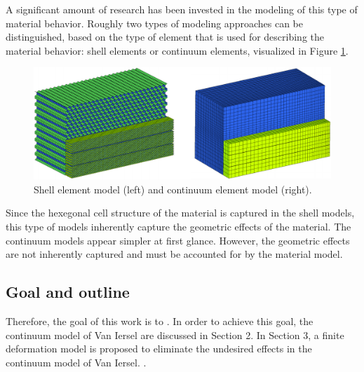 A significant amount of research has been invested in the modeling of this type of material behavior. Roughly two types of modeling approaches can be distinguished, based on the type of element that is used for describing the material behavior: shell elements or continuum elements, visualized in Figure \ref{Ch2_shellsolid}. \\
\begin{figure}[H]
    \centering
    \includegraphics[width=0.8\linewidth]{./Images/Ch1/Ch1_niedermeyer_shellsolid.PNG}
    \caption{Shell element model (left) and continuum element model (right). \cite{niedermeyer}}
    \label{Ch2_shellsolid}
\end{figure}
Since the hexegonal cell structure of the material is captured in the shell models, this type of models inherently capture the geometric effects of the material. The continuum models appear simpler at first glance. However, the geometric effects are not inherently captured and must be accounted for by the material model.\\

{\color{red}{MEER TYPEN}}

\subsection{Goal and outline}
Therefore, the goal of this work is to {\color{red}{INSERT GOAL}}. In order to achieve this goal, the continuum model of Van Iersel are discussed in Section 2. In Section 3, a finite deformation model is proposed to eliminate the undesired effects in the continuum model of Van Iersel. {\color{red}{Section 4....}}.